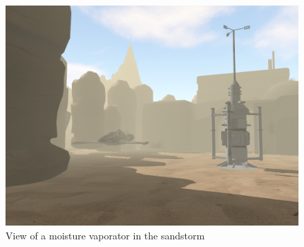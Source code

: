 \begin{figure}
    \centering
    \includegraphics[width=.75\linewidth]{img/fog.png}
    \caption{View of a moisture vaporator in the sandstorm}
    \label{fig:fog}
\end{figure} 
